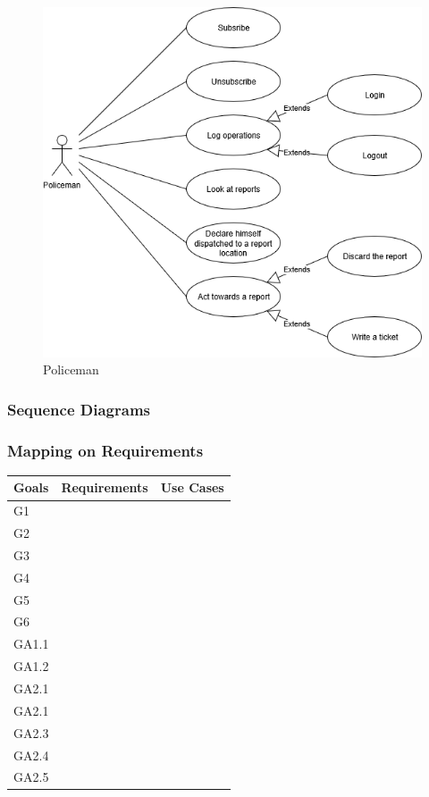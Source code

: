 	\begin{figure}[h!]
		\includegraphics[scale=0.75]{Images/UseCaseDiagram-Policeman}
		\caption{Policeman}
	\end{figure}
\newpage
	
	\subsubsection{Sequence Diagrams}
	
	\subsubsection{Mapping on Requirements}
	
	\begin{table}[]
	\begin{tabular}{|l|l|l|}
	\hline
	\textbf{Goals}					& \textbf{Requirements}	& \textbf{Use Cases}\\ \hline
 	\multirow{2}{*}{G1}		&  &  \\\cline{2-3}
 											& &\\ \hline
 	G2		&  &  \\ \hline
 	G3		&  &  \\ \hline
 	G4		&  &  \\ \hline
 	G5		&  &  \\ \hline
 	G6		&  &  \\ \hline
	GA1.1	&  &  \\ \hline
 	GA1.2	&  &  \\ \hline
 	GA2.1	&  &  \\ \hline
 	GA2.1	&  &  \\ \hline
 	GA2.3	&  &  \\ \hline
 	GA2.4	&  &  \\ \hline
 	GA2.5	&  &  \\ \hline
	\end{tabular}
	\end{table}
	
